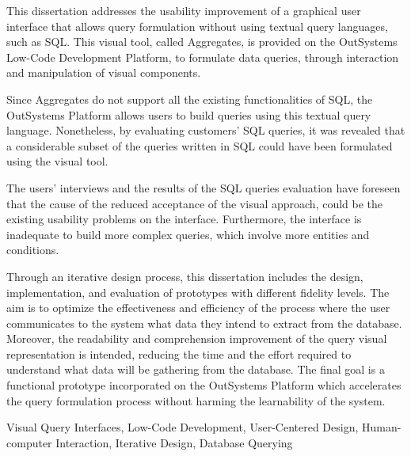 This dissertation addresses the usability improvement of a graphical user interface that allows query formulation without using textual query languages, such as SQL. This visual tool, called Aggregates, is provided on the OutSystems Low-Code Development Platform, to formulate data queries, through interaction and manipulation of visual components. 

Since Aggregates do not support all the existing functionalities of SQL, the OutSystems Platform allows users to build queries using this textual query language. Nonetheless, by evaluating customers' SQL queries, it was revealed that a considerable subset of the queries written in SQL could have been formulated using the visual tool.

The users' interviews and the results of the SQL queries evaluation have foreseen that the cause of the reduced acceptance of the visual approach, could be the existing usability problems on the interface. Furthermore, the interface is inadequate to build more complex queries, which involve more entities and conditions.

Through an iterative design process, this dissertation includes the design, implementation, and evaluation of prototypes with different fidelity levels. The aim is to optimize the effectiveness and efficiency of the process where the user communicates to the system what data they intend to extract from the database. Moreover, the readability and comprehension improvement of the query visual representation is intended, reducing the time and the effort required to understand what data will be gathering from the database. The final goal is a functional prototype incorporated on the OutSystems Platform which accelerates the query formulation process without harming the learnability of the system.


\begin{keywords}
Visual Query Interfaces, Low-Code Development, User-Centered Design, Human-computer Interaction, Iterative Design, Database Querying
\end{keywords} 
